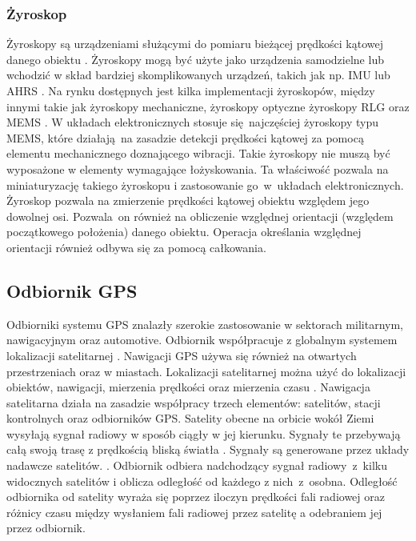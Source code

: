 {{        \subsubsection{Żyroskop}
        {
            Żyroskopy są urządzeniami służącymi do pomiaru bieżącej prędkości kątowej danego obiektu \cite{gyro}. Żyroskopy mogą być użyte jako urządzenia samodzielne lub wchodzić w skład bardziej skomplikowanych urządzeń, takich jak np. IMU lub AHRS \cite{ahrs}. Na rynku dostępnych jest kilka implementacji żyroskopów, między innymi takie jak żyroskopy mechaniczne, żyroskopy optyczne żyroskopy RLG \cite{fogs} oraz MEMS \cite{gyro}.  W układach elektronicznych stosuje się najczęściej żyroskopy typu MEMS, które działają na zasadzie detekcji prędkości kątowej za pomocą elementu mechanicznego doznającego wibracji. Takie żyroskopy nie muszą być wyposażone w elementy wymagające łożyskowania. Ta właściwość pozwala na miniaturyzację takiego żyroskopu i zastosowanie go~w~układach elektronicznych. Żyroskop pozwala na zmierzenie prędkości kątowej obiektu względem jego dowolnej osi. Pozwala~on również na obliczenie względnej orientacji (względem początkowego położenia) danego obiektu. Operacja określania względnej orientacji również odbywa się za pomocą całkowania. 
        }
    }
    \subsection{Odbiornik GPS}
    {
        Odbiorniki systemu GPS znalazły szerokie zastosowanie w sektorach militarnym, nawigacyjnym oraz automotive. Odbiornik współpracuje z globalnym systemem lokalizacji satelitarnej \cite{gps}. Nawigacji GPS używa się również na otwartych przestrzeniach oraz w miastach. Lokalizacji satelitarnej można użyć do lokalizacji obiektów, nawigacji, mierzenia prędkości oraz mierzenia czasu \cite{gps_principles}. Nawigacja satelitarna działa na zasadzie współpracy trzech elementów: satelitów, stacji kontrolnych oraz odbiorników GPS. Satelity obecne na orbicie wokół Ziemi wysyłają sygnał radiowy w sposób ciągły w jej kierunku. Sygnały te przebywają całą swoją trasę z prędkością bliską światła \cite{gps_principles}. Sygnały są generowane przez układy nadawcze satelitów. \cite{gps_principles}. Odbiornik odbiera nadchodzący sygnał radiowy~z~kilku widocznych satelitów i oblicza odległość od każdego z nich~z~osobna. Odległość odbiornika od satelity wyraża się poprzez iloczyn prędkości fali radiowej oraz różnicy czasu między wysłaniem fali radiowej przez satelitę a odebraniem jej przez odbiornik.

}}
